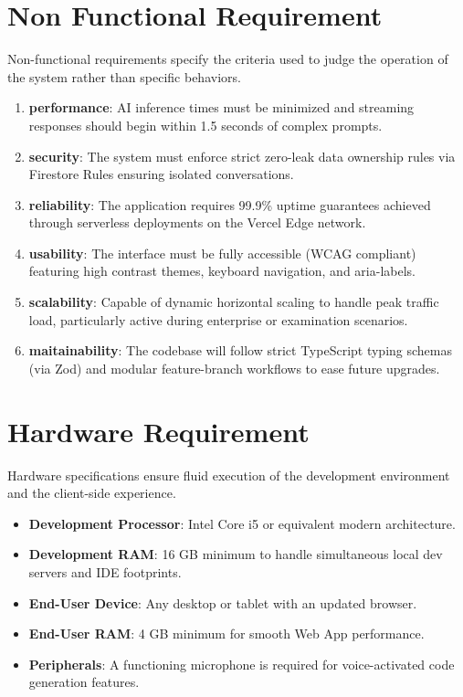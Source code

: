 \section{Non Functional Requirement}
Non-functional requirements specify the criteria used to judge the operation of the system rather than specific behaviors.
\begin{enumerate}
    \item \textbf{performance}: AI inference times must be minimized and streaming responses should begin within 1.5 seconds of complex prompts.
    \item \textbf{security}: The system must enforce strict zero-leak data ownership rules via Firestore Rules ensuring isolated conversations.
    \item \textbf{reliability}: The application requires 99.9\% uptime guarantees achieved through serverless deployments on the Vercel Edge network.
    \item \textbf{usability}: The interface must be fully accessible (WCAG compliant) featuring high contrast themes, keyboard navigation, and aria-labels.
    \item \textbf{scalability}: Capable of dynamic horizontal scaling to handle peak traffic load, particularly active during enterprise or examination scenarios.
    \item \textbf{maitainability}: The codebase will follow strict TypeScript typing schemas (via Zod) and modular feature-branch workflows to ease future upgrades.
\end{enumerate}

\section{Hardware Requirement}
Hardware specifications ensure fluid execution of the development environment and the client-side experience.
\begin{itemize}
    \item \textbf{Development Processor}: Intel Core i5 or equivalent modern architecture.
    \item \textbf{Development RAM}: 16 GB minimum to handle simultaneous local dev servers and IDE footprints.
    \item \textbf{End-User Device}: Any desktop or tablet with an updated browser.
    \item \textbf{End-User RAM}: 4 GB minimum for smooth Web App performance.
    \item \textbf{Peripherals}: A functioning microphone is required for voice-activated code generation features.
\end{itemize}

